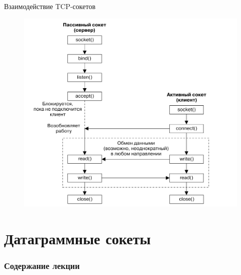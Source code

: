 \documentclass{beamer}
\begin{document}
\begin{frame}{Взаимодействие TCP-сокетов}
    \begin{figure}
    \includegraphics[scale=0.33]{images/tcp_communication.png}
    \end{figure}
\end{frame}

\section{Датаграммные сокеты}

\begin{frame}
  \frametitle{Содержание лекции}
  \tableofcontents[current]
\end{frame}
\end{document}
